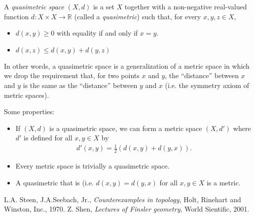 \documentclass[12pt]{article}
\newcommand{\<}{\langle}
\renewcommand{\>}{\rangle}
\begin{document}
A {\em quasimetric space} $(X,d)$ is a set $X$ together with a non-negative real-valued function $d: X \times X \longrightarrow \mathbb{R}$ (called a {\em quasimetric}) such that, for every $x,y,z \in X$,
\begin{itemize}
\item $d(x,y)\geq 0$ with equality if and only if $x=y$.
\item $d(x,z) \leq d(x,y) + d(y,z)$
\end{itemize}

In other words, a quasimetric space is a generalization of a metric space in which we drop the requirement that, for two points $x$ and $y$, the ``distance'' between $x$ and $y$ is the same as the ``distance'' between $y$ and $x$ (i.e. the symmetry axiom of metric spaces).

Some properties:
\begin{itemize}
\item If $(X,d)$ is a quasimetric space, we can form a metric space $(X,d')$ where $d'$ is defined for all $x,y\in X$ by
\begin{align*}
d'(x,y) = \frac{1}{2}(d(x,y)+d(y,x)).
\end{align*}
\item Every metric space is trivially a quasimetric space.
\item A quasimetric that is  (i.e.  $d(x,y)=d(y,x)$ for all $x,y\in X$ is a metric.
\end{itemize}

\begin{thebibliography}{9}
 L.A. Steen, J.A.Seebach, Jr.,
\emph{Counterexamples in topology},
Holt, Rinehart and Winston, Inc., 1970.
Z. Shen, \emph{Lectures of Finsler geometry}, World Sientific, 2001.
\end{thebibliography}
\end{document}
